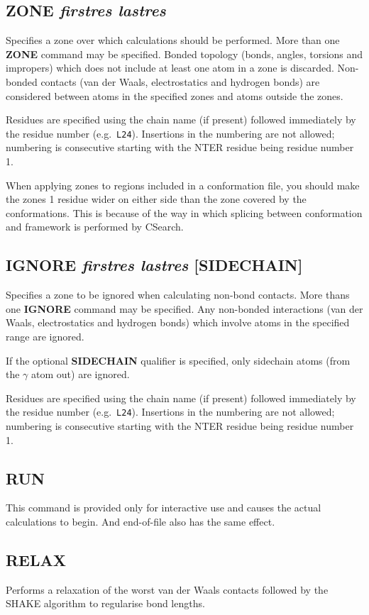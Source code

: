 \documentclass[12pt]{article}
\begin{document}
\subsection{ZONE {\em firstres lastres}}
Specifies a zone over which calculations should be performed. More
than one {\bf ZONE} command may be specified. Bonded topology (bonds,
angles, torsions and impropers) which does not include at least one
atom in a zone is discarded. Non-bonded contacts (van der Waals,
electrostatics and hydrogen bonds) are considered between atoms in the
specified zones and atoms outside the zones.

Residues are specified using the chain name (if present) followed
immediately by the residue number (e.g.\ {\tt L24}). Insertions in the
numbering are not allowed; numbering is consecutive starting with the
NTER residue being residue number 1.

When applying zones to regions included in a conformation file, you
should make the zones 1 residue wider on either side than the zone
covered by the conformations. This is because of the way in which
splicing between conformation and framework is performed by CSearch.

\subsection{IGNORE {\em firstres lastres} [SIDECHAIN]}
Specifies a zone to be ignored when calculating non-bond contacts. More
thans one {\bf IGNORE} command may be specified. Any non-bonded 
interactions (van der Waals, electrostatics and hydrogen bonds) which
involve atoms in the specified range are ignored.

If the optional {\bf SIDECHAIN} qualifier is specified, only sidechain
atoms (from the $\gamma$ atom out) are ignored.

Residues are specified using the chain name (if present) followed
immediately by the residue number (e.g.\ {\tt L24}). Insertions in the
numbering are not allowed; numbering is consecutive starting with the
NTER residue being residue number 1.

\subsection{RUN}
This command is provided only for interactive use and causes the
actual calculations to begin. And end-of-file also has the same effect.

\subsection{RELAX}
Performs a relaxation of the worst van der Waals contacts followed by
the SHAKE algorithm to regularise bond lengths.
\end{document}
